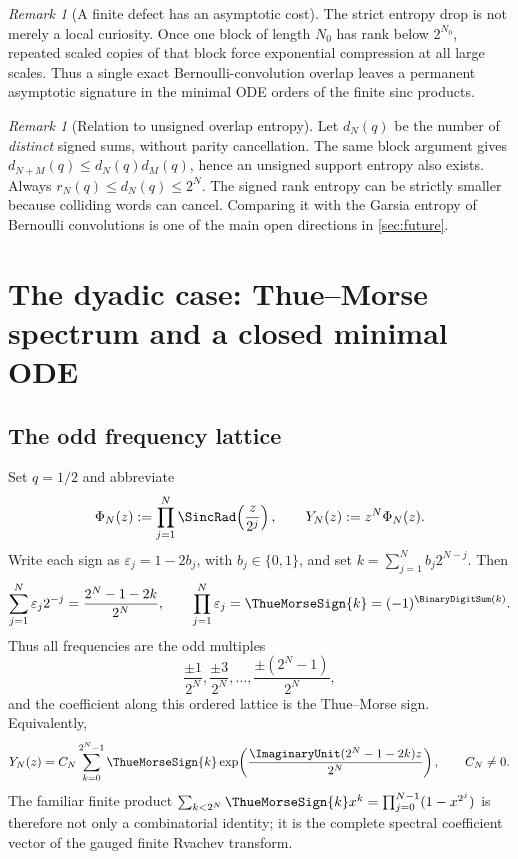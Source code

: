 \documentclass[11pt]{article}
\numberwithin{equation}{section}
\theoremstyle{definition}
\theoremstyle{remark}
\newtheorem{remark}[theorem]{Remark}
\newcommand{\eps}{\varepsilon}
\begin{document}
\begin{remark}[A finite defect has an asymptotic cost]
The strict entropy drop is not merely a local curiosity.  Once one block of
length $N_0$ has rank below $2^{N_0}$, repeated scaled copies of that block
force exponential compression at all large scales.  Thus a single exact
Bernoulli-convolution overlap leaves a permanent asymptotic signature in the
minimal ODE orders of the finite sinc products.
\end{remark}

\begin{remark}[Relation to unsigned overlap entropy]
Let $d_N(q)$ be the number of \emph{distinct} signed sums, without parity
cancellation.  The same block argument gives
$d_{N+M}(q)\le d_N(q)d_M(q)$, hence an unsigned support entropy also exists.
Always $r_N(q)\le d_N(q)\le2^N$.  The signed rank entropy can be strictly
smaller because colliding words can cancel.  Comparing it with the Garsia
entropy of Bernoulli convolutions is one of the main open directions in
\cref{sec:future}.
\end{remark}

\section{The dyadic case: Thue--Morse spectrum and a closed minimal ODE}
\label{sec:dyadic-ode}

\subsection{The odd frequency lattice}

Set $q=1/2$ and abbreviate
\begin{equation}
 \Phi_N(z):=\prod_{j=1}^{N}\SincRad\!\left(\frac{z}{2^j}\right),
 \qquad Y_N(z):=z^N\Phi_N(z).
 \label{eq:dyadic-finite}
\end{equation}
Write each sign as $\eps_j=1-2b_j$, with $b_j\in\{0,1\}$, and set
$k=\sum_{j=1}^{N}b_j2^{N-j}$.  Then
\begin{equation}
 \sum_{j=1}^{N}\eps_j2^{-j}
 =\frac{2^N-1-2k}{2^N},
 \qquad
 \prod_{j=1}^{N}\eps_j=\ThueMorseSign{k}=(-1)^{\BinaryDigitSum(k)}.
 \label{eq:dyadic-frequency-TM}
\end{equation}
Thus all frequencies are the odd multiples
\begin{equation}
 \frac{\pm1}{2^N},\frac{\pm3}{2^N},\ldots,
 \frac{\pm(2^N-1)}{2^N},
 \label{eq:odd-lattice}
\end{equation}
and the coefficient along this ordered lattice is the Thue--Morse sign.
Equivalently,
\begin{equation}
 Y_N(z)=C_N\sum_{k=0}^{2^N-1}
 \ThueMorseSign{k}\exp\!\left(\frac{\ImaginaryUnit(2^N-1-2k)z}{2^N}\right),
 \qquad C_N\ne0.
 \label{eq:TM-exponential}
\end{equation}
The familiar finite product
$\sum_{k<2^N}\ThueMorseSign{k}x^k=\prod_{j=0}^{N-1}(1-x^{2^j})$ is therefore not only a
combinatorial identity; it is the complete spectral coefficient vector of the
gauged finite Rvachev transform.
\end{document}
